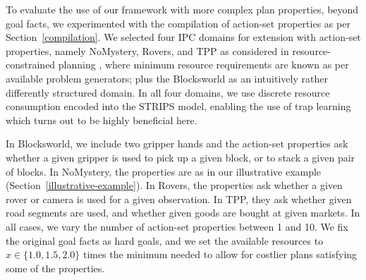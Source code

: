 To evaluate the use of our framework with more complex plan
properties, beyond goal facts, we experimented with the compilation of
action-set properties as per Section~\ref{compilation}. We selected
four IPC domains for extension with action-set properties, namely
NoMystery, Rovers, and TPP as considered in resource-constrained
planning \cite{nakhost:etal:icaps-12}, where minimum resource
requirements are known as per available problem generators; plus the
Blocksworld as an intuitively rather differently structured domain. In
all four domains, we use discrete resource consumption encoded into
the STRIPS model, enabling the use of trap
learning \cite{steinmetz:hoffmann:ijcai-17} which turns out to be
highly beneficial here.

In Blocksworld, we include two gripper hands and the action-set
properties ask whether a given gripper is used to pick up a given
block, or to stack a given pair of blocks. In NoMystery, the
properties are as in our illustrative example
(Section~\ref{illustrative-example}). In Rovers, the properties ask
whether a given rover or camera is used for a given observation. In
TPP, they ask whether given road segments are used, and whether given
goods are bought at given markets. In all cases, we vary the number of
action-set properties between 1 and 10. We fix the original goal facts
as hard goals, and we set the available resources to $x \in \{1.0,1.5,
2.0\}$ times the minimum needed to allow for costlier plans satisfying
some of the properties.

